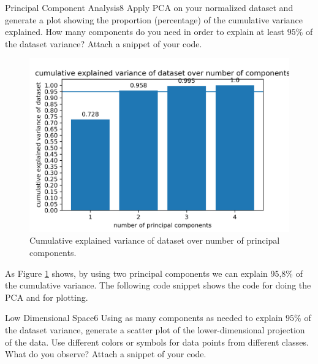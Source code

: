 \begin{questions}
\begin{question}{Principal Component Analysis}{8}
Apply PCA on your normalized dataset and generate a plot showing the proportion (percentage) of the cumulative variance explained. 
How many components do you need in order to explain at least $95\%$ of the dataset variance? 
Attach a snippet of your code.
\begin{figure}[]
	\includegraphics[width=0.8\linewidth]{pictures/explained_var_cumulative.png}
	\centering
	\caption{Cumulative explained variance of dataset over number of principal components.}
	\label{fig:1}
\end{figure}
\begin{answer}
As Figure \ref{fig:1} shows, by using two principal components we can explain 95,8\% of the cumulative variance. The following code snippet shows the code for doing the PCA and for plotting.

\end{answer}
\end{question}


\begin{question}{Low Dimensional Space}{6}
Using as many components as needed to explain $95\%$ of the dataset variance, generate a scatter plot of the lower-dimensional projection of the data. Use different colors or symbols for data points from different classes. 
What do you observe? Attach a snippet of your code.

\begin{answer}\end{answer}

\end{question}



\end{questions}
